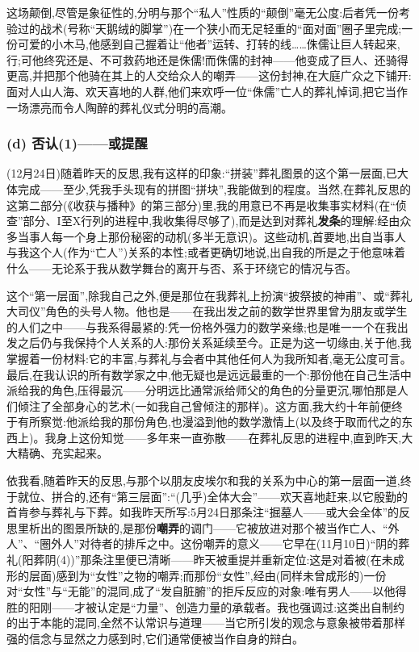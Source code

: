 这场颠倒,尽管是象征性的,分明与那个“私人”性质的“颠倒”毫无公度:后者凭一份考验过的战术(号称“天鹅绒的脚掌”)在一个狭小而无足轻重的“面对面”圈子里完成;一份可爱的小木马,他感到自己握着让“他者”运转、打转的线……侏儒让巨人转起来,行;可他终究还是、不可救药地还是侏儒!而侏儒的封神——他变成了巨人、还骑得更高,并把那个他骑在其上的人交给众人的嘲弄——这份封神,在大庭广众之下铺开:面对人山人海、欢天喜地的人群,他们来欢呼一位“侏儒”亡人的葬礼悼词,把它当作一场漂亮而令人陶醉的葬礼仪式分明的高潮。

\subsubsection*{(d) 否认(1)——或提醒}
\label{ch18:local:h66}

\label{ch18:local:n60}

(12月24日)随着昨天的反思,我有这样的印象:“拼装”葬礼图景的这个第一层面,已大体完成——至少,凭我手头现有的拼图“拼块”,我能做到的程度。当然,在葬礼反思的这第二部分(《收获与播种》的第三部分)里,我的用意已不再是收集事实材料(在“侦查”部分、I至X行列的进程中,我收集得尽够了),而是达到对葬礼\textbf{发条}的理解:经由众多当事人每一个身上那份秘密的动机(多半无意识)。这些动机,首要地,出自当事人与我这个人(作为“亡人”)关系的本性;或者更确切地说,出自我的所是之于他意味着什么——无论系于我从数学舞台的离开与否、系于环绕它的情况与否。

\dmark{}这个“第一层面”,除我自己之外,便是那位在我葬礼上扮演“披祭披的神甫”、或“葬礼大司仪”角色的头号人物。他也是——在我出发之前的数学世界里曾为朋友或学生的人们之中——与我系得最紧的:凭一份格外强力的数学亲缘;也是唯一一个在我出发之后仍与我保持个人关系的人:那份关系延续至今。正是为这一切缘由,关于他,我掌握着一份材料:它的丰富,与葬礼与会者中其他任何人为我所知者,毫无公度可言。最后,在我认识的所有数学家之中,他无疑也是远远最重的一个:那份他在自己生活中派给我的角色,压得最沉——分明远比通常派给师父的角色的分量更沉,哪怕那是人们倾注了全部身心的艺术(一如我自己曾倾注的那样)。这方面,我大约十年前便终于有所察觉:他派给我的那份角色,也漫溢到他的数学激情上(以及终于取而代之的东西上)。我身上这份知觉——多年来一直弥散——在葬礼反思的进程中,直到昨天,大大精确、充实起来。

依我看,随着昨天的反思,与那个以朋友皮埃尔和我的关系为中心的第一层面一道,终于就位、拼合的,还有“第三层面”:“(几乎)全体大会”——欢天喜地赶来,以它殷勤的首肯参与葬礼与下葬。如我昨天所写:5月24日那条注“掘墓人——或大会全体”的反思里析出的图景所缺的,是那份\textbf{嘲弄}的调门——它被放进对那个被当作亡人、“外人”、“圈外人”对待者的排斥之中。这份嘲弄的意义——它早在(11月10日)“阴的葬礼(阳葬阴(4))”那条注里便已清晰——昨天被重提并重新定位:这是对着被(在未成形的层面)感到为“女性”之物的嘲弄;而那份“女性”,经由(同样未曾成形的)一份对“女性”与“无能”的混同,成了“发自脏腑”的拒斥反应的对象:唯有男人——以他得胜的阳刚——才被认定是“力量”、创造力量的承载者。我也强调过:这类出自制约的出于本能的混同,全然不认常识与道理——当它所引发的观念与意象\dmark{}被带着那样强的信念与显然之力感到时,它们通常便被当作自身的辩白。

